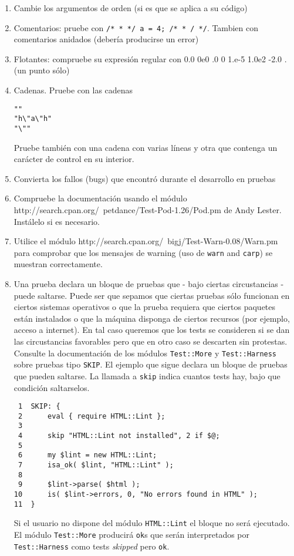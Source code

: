 \begin{enumerate}
No use prototipos para lograrlo. No es una buena idea. Los prototipos en Perl
a menudo producen un preprocesado del parámetro. Escriba código que controle que 
la naturaleza del parámetro es la que se espera. Por ejemplo:

\begin{verbatim}
sub tutu {
  my $refhash = shift;
  croak "Error" unless UNIVERSAL::isa($refhash, 'HASH');
  ...
}
\end{verbatim}
\item
Cambie los argumentos de orden (si es que se aplica a su código)
\item
Comentarios: pruebe con \verb|/* * */ a = 4; /* * / */|. Tambien con
comentarios anidados (debería producirse un error)
\item
Flotantes: compruebe su expresión regular con 0.0 0e0 .0 0 1.e-5 1.0e2 -2.0  . (un punto sólo)
\item
Cadenas. Pruebe con las cadenas
\begin{verbatim}
"" 
"h\"a\"h" 
"\"" 
\end{verbatim}
Pruebe también con una cadena con varias líneas y
otra que contenga un carácter de control en su interior.
\item
Convierta los fallos (bugs) que encontró durante el desarrollo en pruebas
\item
Compruebe la documentación usando el módulo
{http://search.cpan.org/~petdance/Test-Pod-1.26/Pod.pm}
de Andy Lester. Instálelo si es necesario.

\item
Utilice el módulo 
{http://search.cpan.org/~bigj/Test-Warn-0.08/Warn.pm}
para comprobar que los mensajes de warning (uso de \verb|warn| and \verb|carp|)
se muestran correctamente.

\item
Una prueba  declara un bloque de pruebas
que - bajo ciertas circustancias - puede saltarse.
Puede ser que sepamos que ciertas pruebas 
sólo funcionan en ciertos sistemas operativos 
o que la prueba requiera que ciertos paquetes están instalados 
o que la máquina
disponga de ciertos recursos (por ejemplo, acceso a internet).
En tal caso queremos que los tests se consideren si se dan las circustancias
favorables pero que en otro caso se descarten sin protestas.
Consulte la documentación de los módulos \verb|Test::More| y \verb|Test::Harness|
sobre pruebas tipo {\tt SKIP}. El ejemplo que sigue
declara un bloque de pruebas que pueden saltarse.
La llamada a \verb|skip| indica cuantos tests hay,
bajo que condición saltarselos.
\begin{verbatim}
 1  SKIP: {
 2      eval { require HTML::Lint };
 3 
 4      skip "HTML::Lint not installed", 2 if $@;
 5 
 6      my $lint = new HTML::Lint;
 7      isa_ok( $lint, "HTML::Lint" );
 8 
 9      $lint->parse( $html );
10      is( $lint->errors, 0, "No errors found in HTML" );
11  }
\end{verbatim}
Si el usuario no dispone del módulo \verb|HTML::Lint| 
el bloque no será ejecutado.
El módulo \verb|Test::More| producirá \verb|ok|s que serán
interpretados por  \verb|Test::Harness| como tests \emph{skipped}
pero \verb|ok|.


\end{enumerate}
